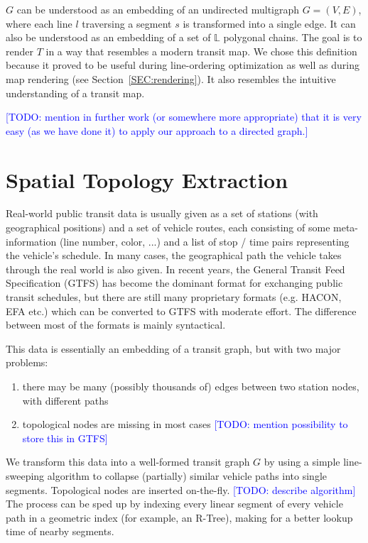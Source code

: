 \documentclass{llncs}
\newcommand\todo[1]{\textcolor{blue}{[TODO: #1]}}
\begin{document}
$G$ can be understood as an embedding of an undirected multigraph $G = (V, E)$, where each line $l$ traversing a segment $s$ is transformed into a single edge. It can also be understood as an embedding of a set of $\mathbb{L}$ polygonal chains.
The goal is to render $T$ in a way that resembles a modern transit map.
We chose this definition because it proved to be useful during line-ordering optimization as well as during map rendering (see Section~\ref{SEC:rendering}). It also resembles the intuitive understanding of a transit map.

\todo{mention in further work (or somewhere more appropriate) that it is very easy (as we have done it) to apply our approach to a directed graph.}

%
\section{Spatial Topology Extraction}\label{SEC:topo}
%

Real-world public transit data is usually given as a set of stations (with geographical positions) and a set of vehicle routes, each consisting of some meta-information (line number, color, ...) and a list of stop / time pairs representing the vehicle's schedule. In many cases, the geographical path the vehicle takes through the real world is also given. In recent years, the General Transit Feed Specification (GTFS) has become the dominant format for exchanging public transit schedules, but there are still many proprietary formats (e.g. HACON, EFA etc.) which can be converted to GTFS with moderate effort. The difference between most of the formats is mainly syntactical.

This data is essentially an embedding of a transit graph, but with two major problems:
\begin{enumerate}
	\item there may be many (possibly thousands of) edges between two station nodes, with different paths
	\item topological nodes are missing in most cases \todo{mention possibility to store this in GTFS}
\end{enumerate}

We transform this data into a well-formed transit graph $G$ by using a simple line-sweeping algorithm to collapse (partially) similar vehicle paths into single segments. Topological nodes are inserted on-the-fly.
\todo{describe algorithm}
% 
The process can be sped up by indexing every linear segment of every vehicle path in a geometric index (for example, an R-Tree), making for a better lookup time of nearby segments.
\end{document}
